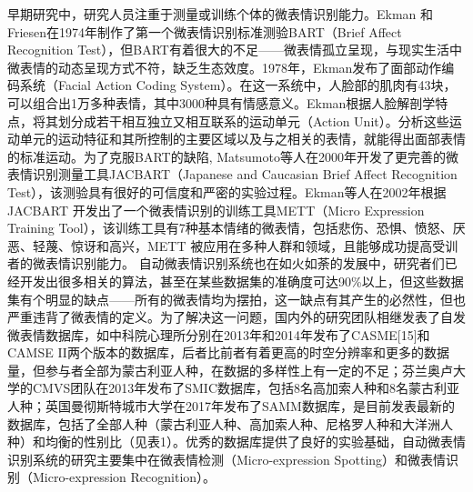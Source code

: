 早期研究中，研究人员注重于测量或训练个体的微表情识别能力。Ekman 和Friesen在1974年制作了第一个微表情识别标准测验BART（Brief Affect Recognition Test），但BART有着很大的不足——微表情孤立呈现，与现实生活中微表情的动态呈现方式不符，缺乏生态效度。1978年，Ekman发布了面部动作编码系统（Facial Action Coding System）。在这一系统中，人脸部的肌肉有43块，可以组合出1万多种表情，其中3000种具有情感意义。Ekman根据人脸解剖学特点，将其划分成若干相互独立又相互联系的运动单元（Action Unit）。分析这些运动单元的运动特征和其所控制的主要区域以及与之相关的表情，就能得出面部表情的标准运动。为了克服BART的缺陷, Matsumoto等人在2000年开发了更完善的微表情识别测量工具JACBART（Japanese and Caucasian Brief Affect Recognition Test），该测验具有很好的可信度和严密的实验过程。Ekman等人在2002年根据JACBART 开发出了一个微表情识别的训练工具METT（Micro Expression Training Tool），该训练工具有7种基本情绪的微表情，包括悲伤、恐惧、愤怒、厌恶、轻蔑、惊讶和高兴，METT 被应用在多种人群和领域，且能够成功提高受训者的微表情识别能力。
自动微表情识别系统也在如火如荼的发展中，研究者们已经开发出很多相关的算法，甚至在某些数据集的准确度可达90\%以上，但这些数据集有个明显的缺点——所有的微表情均为摆拍，这一缺点有其产生的必然性，但也严重违背了微表情的定义。为了解决这一问题，国内外的研究团队相继发表了自发微表情数据库，如中科院心理所分别在2013年和2014年发布了CASME[15]和CAMSE II两个版本的数据库，后者比前者有着更高的时空分辨率和更多的数据量，但参与者全部为蒙古利亚人种，在数据的多样性上有一定的不足；芬兰奥卢大学的CMVS团队在2013年发布了SMIC数据库，包括8名高加索人种和8名蒙古利亚人种；英国曼彻斯特城市大学在2017年发布了SAMM数据库，是目前发表最新的数据库，包括了全部人种（蒙古利亚人种、高加索人种、尼格罗人种和大洋洲人种）和均衡的性别比（见表1）。优秀的数据库提供了良好的实验基础，自动微表情识别系统的研究主要集中在微表情检测（Micro-expression Spotting）和微表情识别（Micro-expression Recognition）。
